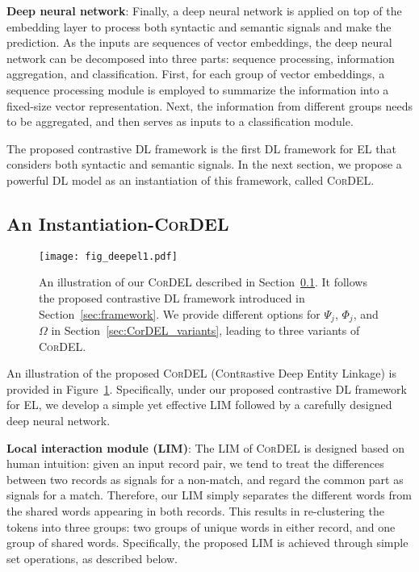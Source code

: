 \documentclass[conference]{IEEEtran}
\begin{document}
\textbf{Deep neural network}: Finally, a deep neural network is applied on top of the embedding layer to process both syntactic and semantic signals and make the prediction. As the inputs are sequences of vector embeddings, the deep neural network can be decomposed into three parts: sequence processing, information aggregation, and classification. First, for each group of vector embeddings, a sequence processing module is employed to summarize the information into a fixed-size vector representation. Next, the information from different groups needs to be aggregated, and then serves as inputs to a classification module.

The proposed contrastive DL framework is the first DL framework for EL that considers both syntactic and semantic signals. In the next section, we propose a powerful DL model as an instantiation of this framework, called \textsc{CorDEL}.


\subsection{An Instantiation-\textsc{CorDEL}}\label{sec:local_interact}


\begin{figure}
	\centering
	\texttt{[image: fig\_deepel1.pdf]}
	\caption{An illustration of our \textsc{CorDEL} described in Section~\ref{sec:local_interact}. It follows the proposed contrastive DL framework introduced in Section~\ref{sec:framework}. We provide different options for $\Psi_j$, $\Phi_j$, and $\Omega$ in Section~\ref{sec:CorDEL_variants}, leading to three variants of \textsc{CorDEL}.}
	\label{fig:CorDEL}
\end{figure}


An illustration of the proposed \textsc{CorDEL} (C\textsc{o}nt\textsc{r}astive Deep Entity Linkage) is provided in Figure~\ref{fig:CorDEL}. Specifically, under our proposed contrastive DL framework for EL, we develop a simple yet effective LIM followed by a carefully designed deep neural network.

\textbf{Local interaction module (LIM)}: The LIM of \textsc{CorDEL} is designed based on human intuition: given an input record pair, we tend to treat the differences between two records as signals for a non-match, and regard the common part as signals for a match. Therefore, our LIM simply separates the different words from the shared words appearing in both records. This results in re-clustering the tokens into three groups: two groups of unique words in either record, and one group of shared words. Specifically, the proposed LIM is achieved through simple set operations, as described below.
\end{document}
